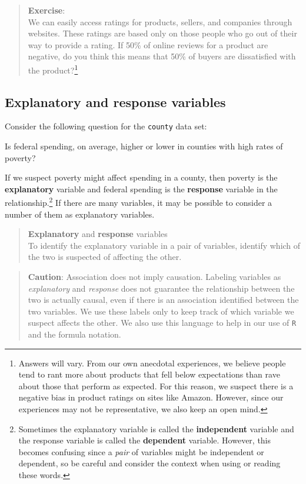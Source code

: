 \documentclass[
]{book}
\begin{document}
\begin{quote}
\textbf{Exercise}:\\
We can easily access ratings for products, sellers, and companies through websites. These ratings are based only on those people who go out of their way to provide a rating. If 50\% of online reviews for a product are negative, do you think this means that 50\% of buyers are dissatisfied with the product?\footnote{Answers will vary. From our own anecdotal experiences, we believe people tend to rant more about products that fell below expectations than rave about those that perform as expected. For this reason, we suspect there is a negative bias in product ratings on sites like Amazon. However, since our experiences may not be representative, we also keep an open mind.}
\end{quote}

\hypertarget{explanatory-and-response-variables}{%
\subsection{Explanatory and response variables}\label{explanatory-and-response-variables}}

Consider the following question for the \texttt{county} data set:

Is federal spending, on average, higher or lower in counties with high rates of poverty?

If we suspect poverty might affect spending in a county, then poverty is the \textbf{explanatory} variable and federal spending is the \textbf{response} variable in the relationship.\footnote{Sometimes the explanatory variable is called the \textbf{independent} variable and the response variable is called the \textbf{dependent} variable. However, this becomes confusing since a \emph{pair} of variables might be independent or dependent, so be careful and consider the context when using or reading these words.} If there are many variables, it may be possible to consider a number of them as explanatory variables.

\begin{quote}
\textbf{Explanatory} and \textbf{response} variables\\
To identify the explanatory variable in a pair of variables, identify which of the two is suspected of affecting the other.
\end{quote}

\begin{quote}
\textbf{Caution}:
Association does not imply causation. Labeling variables as \emph{explanatory} and \emph{response} does not guarantee the relationship between the two is actually causal, even if there is an association identified between the two variables. We use these labels only to keep track of which variable we suspect affects the other. We also use this language to help in our use of \texttt{R} and the formula notation.
\end{quote}
\end{document}
